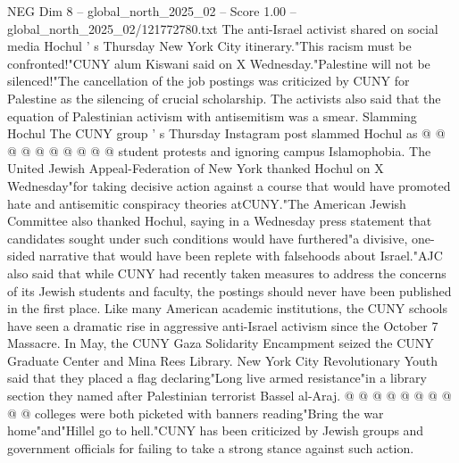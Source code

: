 \begin{textsample}{NEG Dim 8 – global\_north\_2025\_02 – Score 1.00 – global\_north\_2025\_02/121772780.txt}
The anti-Israel activist shared on social media Hochul ' s Thursday New York City itinerary."This racism must be confronted!"CUNY alum Kiswani said on X Wednesday."Palestine will not be silenced!"The cancellation of the job postings was criticized by CUNY for Palestine as the silencing of crucial scholarship.
The activists also said that the equation of Palestinian activism with antisemitism was a smear.
Slamming Hochul The CUNY group ' s Thursday Instagram post slammed Hochul as @ @ @ @ @ @ @ @ @ @ student protests and ignoring campus Islamophobia.
The United Jewish Appeal-Federation of New York thanked Hochul on X Wednesday"for taking decisive action against a course that would have promoted hate and antisemitic conspiracy theories atCUNY."The American Jewish Committee also thanked Hochul, saying in a Wednesday press statement that candidates sought under such conditions would have furthered"a divisive, one-sided narrative that would have been replete with falsehoods about Israel."AJC also said that while CUNY had recently taken measures to address the concerns of its Jewish students and faculty, the postings should never have been published in the first place.
Like many American academic institutions, the CUNY schools have seen a dramatic rise in aggressive anti-Israel activism since the October 7 Massacre.
In May, the CUNY Gaza Solidarity Encampment seized the CUNY Graduate Center and Mina Rees Library.
New York City Revolutionary Youth said that they placed a flag declaring"Long live armed resistance"in a library section they named after Palestinian terrorist Bassel al-Araj. @ @ @ @ @ @ @ @ @ @ colleges were both picketed with banners reading"Bring the war home"and"Hillel go to hell."CUNY has been criticized by Jewish groups and government officials for failing to take a strong stance against such action.

\end{textsample}

